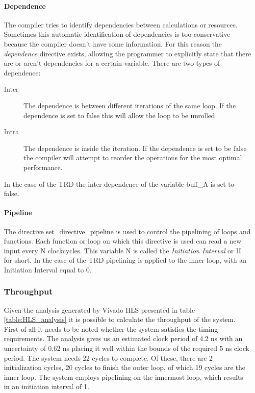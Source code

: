 \documentclass[a4paper]{report}
\begin{document}
\paragraph{Dependence} The compiler tries to identify dependencies between calculations or resources. Sometimes this automatic identification of dependencies is too conservative because the compiler doesn't have some information. For this reason the \emph{dependence} directive exists, allowing the programmer to explicitly state that there are or aren't dependencies for a certain variable. There are two types of dependence:

\begin{description}
\item[Inter] The dependence is between different iterations of the same loop. If the dependence is set to false this will allow the loop to be unrolled
\item[Intra] The dependence is inside the iteration. If the dependence is set to be false the compiler will attempt to reorder the operations for the most optimal performance.
\end{description}

In the case of the TRD the inter-dependence of the variable buff\_A is set to false.

\paragraph{Pipeline} The directive set\_directive\_pipeline is used to control the pipelining of loops and functions. Each function or loop on which this directive is used can read a new input every N clockcycles. This variable N is called the \emph{Initiation Interval} or II for short. In the case of the TRD pipelining is applied to the inner loop, with an Initiation Interval equal to 0.


\subsubsection{Throughput}
\label{sec:original_througput}

Given the analysis generated by Vivado HLS presented in table \ref{table:HLS_analysis} it is possible to calculate the throughput of the system. First of all it needs to be noted whether the system satisfies the timing requirements. The analysis gives us an estimated clock period of 4.2 ns with an uncertainty of 0.62 ns placing it well within the bounds of the required 5 ns clock period.
The system needs 22 cycles to complete. Of these, there are 2 initialization cycles, 20 cycles to finish the outer loop, of which 19 cycles are the inner loop. The system employs pipelining on the innermost loop, which results in an initiation interval of 1.
\end{document}

